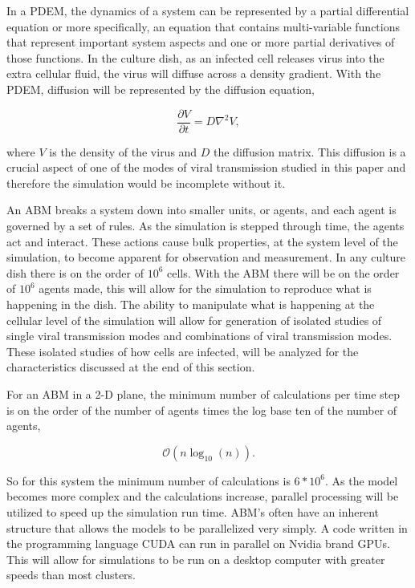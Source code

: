 \documentclass[a4paper]{article}
\begin{document}
In a PDEM, the dynamics of a system can be represented by a partial differential equation or more specifically, an equation that contains multi-variable functions that represent important system aspects and one or more partial derivatives of those functions. In the culture dish, as an infected cell releases virus into the extra cellular fluid, the virus will diffuse across a density gradient. With the PDEM, diffusion will be represented by the diffusion equation, 

$$\frac{\partial V}{\partial t}=D \nabla^{2}V,$$

\noindent
where $V$ is the density of the virus and $D$ the diffusion matrix. This diffusion is a crucial aspect of one of the modes of viral transmission studied in this paper and therefore the simulation would be incomplete without it.

An ABM breaks a system down into smaller units, or agents, and each agent is governed by a set of rules. As the simulation is stepped through time, the agents act and interact.  These actions cause bulk properties, at the system level of the simulation, to become apparent for observation and measurement. In any culture dish \cite{website1} there is on the order of $10^6$ cells. With the ABM there will be on the order of $10^6$ agents made, this will allow for the simulation to reproduce what is happening in the dish. The ability to manipulate what is happening at the cellular level of the simulation will allow for generation of isolated studies of single viral transmission modes and combinations of viral transmission modes. These isolated studies of how cells are infected, will be analyzed for the characteristics discussed at the end of this section.

For an ABM in a 2-D plane, the minimum number of calculations per time step is on the order of the number of agents times the log base ten of the number of agents, 

$$\mathcal{O}(n\log_{10} (n)).$$

\noindent
So for this system the minimum number of calculations is $6*10^6$. As the model becomes more complex and the calculations increase, parallel processing will be utilized to speed up the simulation run time. ABM's often have an inherent structure that allows the models to be parallelized very simply. A code written in the programming language CUDA can run in parallel on Nvidia brand GPUs. This will allow for simulations to be run on a desktop computer with greater speeds than most clusters.
\end{document}
